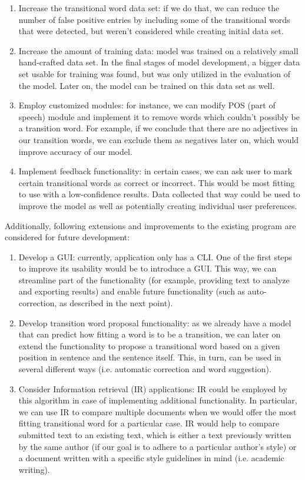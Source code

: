 \documentclass[conference]{IEEEtran}
\begin{document}
\begin{enumerate}
    \item Increase the transitional word data set: if we do that, we can reduce the number of false positive entries by including some of the transitional words that were detected, but weren't considered while creating initial data set.
    \item Increase the amount of training data: model was trained on a relatively small hand-crafted data set. In the final stages of model development, a bigger data set usable for training was found, but was only utilized in the evaluation of the model. Later on, the model can be trained on this data set as well.
    \item Employ customized modules: for instance, we can modify POS (part of speech) module and implement it to remove words which couldn't possibly be a transition word. For example, if we conclude that there are no adjectives in our transition words, we can exclude them as negatives later on, which would improve accuracy of our model.
    \item Implement feedback functionality: in certain cases, we can ask user to mark certain transitional words as correct or incorrect. This would be most fitting to use with a low-confidence results. Data collected that way could be used to improve the model as well as potentially creating individual user preferences.
\end{enumerate}

Additionally, following extensions and improvements to the existing program are considered for future development:

\begin{enumerate}
    \item Develop a GUI: currently, application only has a CLI. One of the first steps to improve its usability would be to introduce a GUI. This way, we can streamline part of the functionality (for example, providing text to analyze and exporting results) and enable future functionality (such as auto-correction, as described in the next point).
    \item Develop transition word proposal functionality: as we already have a model that can predict how fitting a word is to be a transition, we can later on extend the functionality to propose a transitional word based on a given position in sentence and the sentence itself. This, in turn, can be used in several different ways (i.e. automatic correction and word suggestion).
    \item Consider Information retrieval (IR) applications: IR could be employed by this algorithm in case of implementing additional functionality. In particular, we can use IR to compare multiple documents when we would offer the most fitting transitional word for a particular case. IR would help to compare submitted text to an existing text, which is either a text previously written by the same author (if our goal is to adhere to a particular author's style) or a document written with a specific style guidelines in mind (i.e. academic writing).
\end{enumerate}

\printbibliography[heading=bibintoc,title={Bibliography cited}]
\end{document}
